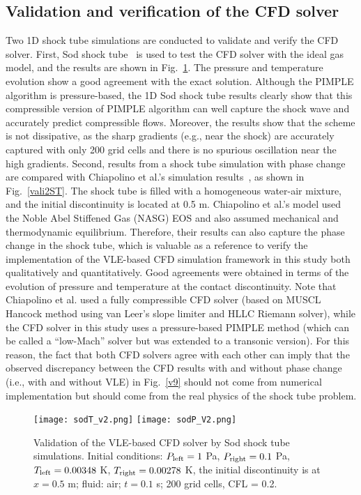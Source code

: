     \subsection{Validation and verification of the CFD solver} \label{App:vali:CFD}
    Two 1D shock tube simulations are conducted to validate and verify the CFD solver. First, Sod shock tube~\cite{sod1978survey} is used to test the CFD solver with the ideal gas model, and the results are shown in Fig.~\ref{vali1ST}. The pressure and temperature evolution show a good agreement with the exact solution. Although the PIMPLE algorithm is pressure-based, the 1D Sod shock tube results clearly show that this compressible version of PIMPLE algorithm can well capture the shock wave and accurately predict compressible flows. Moreover, the results show that the scheme is not dissipative, as the sharp gradients (e.g., near the shock) are accurately captured with only 200 grid cells and there is no spurious oscillation near the high gradients. Second, results from a shock tube simulation with phase change are compared with Chiapolino et al.'s simulation results~\cite{chiapolino2017simple}, as shown in Fig.~\ref{vali2ST}. The shock tube is filled with a homogeneous water-air mixture, and the initial discontinuity is located at 0.5 m. Chiapolino et al.'s model used the Noble Abel Stiffened Gas (NASG) EOS and also assumed mechanical and thermodynamic equilibrium. Therefore, their results can also capture the phase change in the shock tube, which is valuable as a reference to verify the implementation of the VLE-based CFD simulation framework in this study both qualitatively and quantitatively. Good agreements were obtained in terms of the evolution of pressure and temperature at the contact discontinuity.
    Note that Chiapolino et al. used a fully compressible CFD solver (based on MUSCL Hancock method using van Leer’s slope limiter and HLLC Riemann solver), while the CFD solver in this study uses a pressure-based PIMPLE method (which can be called a ``low-Mach'' solver but was extended to a transonic version). For this reason, the fact that both CFD solvers agree with each other can imply that the observed discrepancy between the CFD results with and without phase change (i.e., with and without VLE) in Fig.~\ref{v9} should not come from numerical implementation but should come from the real physics of the shock tube problem.
    \begin{figure}[htbp]

            \texttt{[image: sodT\_v2.png]}
            \texttt{[image: sodP\_V2.png]}

        \caption{Validation of the VLE-based CFD solver by Sod shock tube simulations. Initial conditions: $P_{\rm{left}} = 1$ Pa, $P_{\rm{right}} = 0.1$ Pa, $T_{\rm{left}} = 0.00348$ K, $T_{\rm{right}} = 0.00278$ K, the initial discontinuity is at $x=0.5$ m; fluid: air; $t=0.1$ s; 200 grid cells, CFL = 0.2.}
        \label{vali1ST}
    \end{figure}
    
